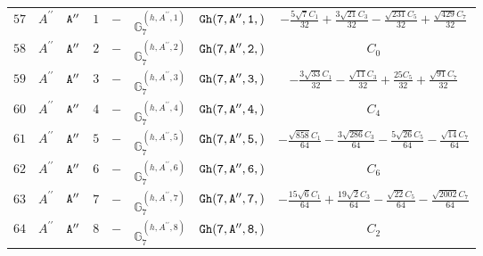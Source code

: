 \documentclass[fleqn,8pt]{jsarticle}
\begin{document}
\begin{table}[ht!]
\begin{center}
\begin{tabular}{cccccccc}
$ 57 $ & $ A^{\prime\prime} $ & $ {\tt A''} $ & $ 1 $ & $ - $ & $ \mathbb{G}_{7}^{(h,A^{\prime\prime},1)} $ & $ {\tt Gh(7,A'',1,)} $ & $ - \frac{5 \sqrt{7} C_{1}}{32} + \frac{3 \sqrt{21} C_{3}}{32} - \frac{\sqrt{231} C_{5}}{32} + \frac{\sqrt{429} C_{7}}{32} $ \\
$ 58 $ & $ A^{\prime\prime} $ & $ {\tt A''} $ & $ 2 $ & $ - $ & $ \mathbb{G}_{7}^{(h,A^{\prime\prime},2)} $ & $ {\tt Gh(7,A'',2,)} $ & $ C_{0} $ \\
$ 59 $ & $ A^{\prime\prime} $ & $ {\tt A''} $ & $ 3 $ & $ - $ & $ \mathbb{G}_{7}^{(h,A^{\prime\prime},3)} $ & $ {\tt Gh(7,A'',3,)} $ & $ - \frac{3 \sqrt{33} C_{1}}{32} - \frac{\sqrt{11} C_{3}}{32} + \frac{25 C_{5}}{32} + \frac{\sqrt{91} C_{7}}{32} $ \\
$ 60 $ & $ A^{\prime\prime} $ & $ {\tt A''} $ & $ 4 $ & $ - $ & $ \mathbb{G}_{7}^{(h,A^{\prime\prime},4)} $ & $ {\tt Gh(7,A'',4,)} $ & $ C_{4} $ \\
$ 61 $ & $ A^{\prime\prime} $ & $ {\tt A''} $ & $ 5 $ & $ - $ & $ \mathbb{G}_{7}^{(h,A^{\prime\prime},5)} $ & $ {\tt Gh(7,A'',5,)} $ & $ - \frac{\sqrt{858} C_{1}}{64} - \frac{3 \sqrt{286} C_{3}}{64} - \frac{5 \sqrt{26} C_{5}}{64} - \frac{\sqrt{14} C_{7}}{64} $ \\
$ 62 $ & $ A^{\prime\prime} $ & $ {\tt A''} $ & $ 6 $ & $ - $ & $ \mathbb{G}_{7}^{(h,A^{\prime\prime},6)} $ & $ {\tt Gh(7,A'',6,)} $ & $ C_{6} $ \\
$ 63 $ & $ A^{\prime\prime} $ & $ {\tt A''} $ & $ 7 $ & $ - $ & $ \mathbb{G}_{7}^{(h,A^{\prime\prime},7)} $ & $ {\tt Gh(7,A'',7,)} $ & $ - \frac{15 \sqrt{6} C_{1}}{64} + \frac{19 \sqrt{2} C_{3}}{64} - \frac{\sqrt{22} C_{5}}{64} - \frac{\sqrt{2002} C_{7}}{64} $ \\
$ 64 $ & $ A^{\prime\prime} $ & $ {\tt A''} $ & $ 8 $ & $ - $ & $ \mathbb{G}_{7}^{(h,A^{\prime\prime},8)} $ & $ {\tt Gh(7,A'',8,)} $ & $ C_{2} $ \\
 \hline \hline
\end{tabular}
\end{center}
\end{table}
\end{document}
